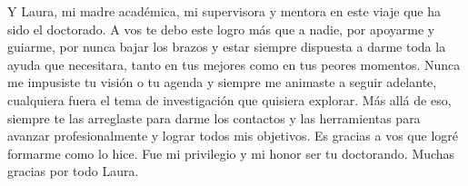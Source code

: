 \documentclass[
11pt, %
english, %
onehalfspacing, %
nolistspacing, %
headsepline, %
consistentlayout, %
]{MastersDoctoralThesis} %
\begin{document}
\begin{acknowledgements}
  Y Laura, mi madre académica, mi supervisora y mentora en este viaje que ha
  sido el doctorado. A vos te debo este logro más que a nadie, por apoyarme y
  guiarme, por nunca bajar los brazos y estar siempre dispuesta a darme toda la
  ayuda que necesitara, tanto en tus mejores como en tus peores momentos. Nunca
  me impusiste tu visión o tu agenda y siempre me animaste a seguir adelante,
  cualquiera fuera el tema de investigación que quisiera explorar. Más allá de
  eso, siempre te las arreglaste para darme los contactos y las herramientas
  para avanzar profesionalmente y lograr todos mis objetivos. Es gracias a vos
  que logré formarme como lo hice. Fue mi privilegio y mi honor ser tu
  doctorando. Muchas gracias por todo Laura.

\end{acknowledgements}


\tableofcontents %

\listoffigures %



% 
% 


% 
% 
% 
\end{document}
